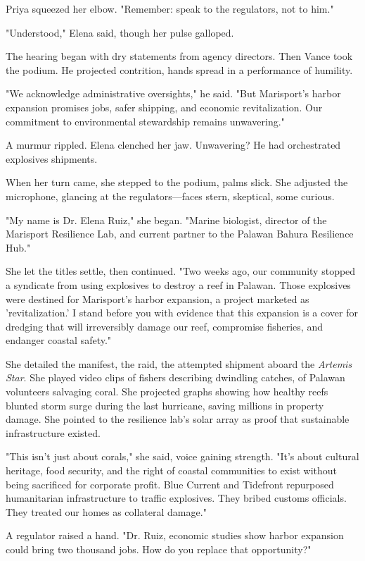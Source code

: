 Priya squeezed her elbow. "Remember: speak to the regulators, not to him."

"Understood," Elena said, though her pulse galloped.

The hearing began with dry statements from agency directors. Then Vance took the podium. He projected contrition, hands spread in a performance of humility.

"We acknowledge administrative oversights," he said. "But Marisport's harbor expansion promises jobs, safer shipping, and economic revitalization. Our commitment to environmental stewardship remains unwavering."

A murmur rippled. Elena clenched her jaw. Unwavering? He had orchestrated explosives shipments.

When her turn came, she stepped to the podium, palms slick. She adjusted the microphone, glancing at the regulators—faces stern, skeptical, some curious.

"My name is Dr. Elena Ruiz," she began. "Marine biologist, director of the Marisport Resilience Lab, and current partner to the Palawan Bahura Resilience Hub."

She let the titles settle, then continued. "Two weeks ago, our community stopped a syndicate from using explosives to destroy a reef in Palawan. Those explosives were destined for Marisport's harbor expansion, a project marketed as 'revitalization.' I stand before you with evidence that this expansion is a cover for dredging that will irreversibly damage our reef, compromise fisheries, and endanger coastal safety."

She detailed the manifest, the raid, the attempted shipment aboard the \textit{Artemis Star}. She played video clips of fishers describing dwindling catches, of Palawan volunteers salvaging coral. She projected graphs showing how healthy reefs blunted storm surge during the last hurricane, saving millions in property damage. She pointed to the resilience lab's solar array as proof that sustainable infrastructure existed.

"This isn't just about corals," she said, voice gaining strength. "It's about cultural heritage, food security, and the right of coastal communities to exist without being sacrificed for corporate profit. Blue Current and Tidefront repurposed humanitarian infrastructure to traffic explosives. They bribed customs officials. They treated our homes as collateral damage."

A regulator raised a hand. "Dr. Ruiz, economic studies show harbor expansion could bring two thousand jobs. How do you replace that opportunity?"

